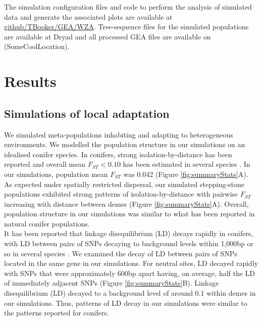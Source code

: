 \documentclass[10pt,twoside,lineno]{GSA_format}
\begin{document}
The simulation configuration files and code to perform the analysis of simulated data and generate the associated plots are available at \url{github/TBooker/GEA/WZA}. Tree-sequence files for the simulated populations are available at Dryad and all processed GEA files are available on (SomeCoolLocation). 

\section{Results}

\subsection{Simulations of local adaptation}

We simulated meta-populations inhabiting and adapting to heterogeneous environments. We modelled the population structure in our simulations on an idealised conifer species. In conifers, strong isolation-by-distance has been reported and overall mean $F_{ST} < 0.10$ has been estimated in several species \citep{Mimura2007,Mosca2014}. In our simulations, population mean $F_{ST}$ was 0.042 (Figure \ref{fig:summaryStats}A). As expected under spatially restricted dispersal, our simulated stepping-stone populations exhibited strong patterns of isolation-by-distance with pairwise $F_{ST}$ increasing with distance between demes (Figure \ref{fig:summaryStats}A). Overall, population structure in our simulations was similar to what has been reported in natural conifer populations.\\

It has been reported that linkage disequilibrium (LD) decays rapidly in conifers, with LD between pairs of SNPs decaying to background levels within 1,000bp or so in several species \citep{Pavy2012}. We examined the decay of LD between pairs of SNPs located in the same gene in our simulations. For neutral sites, LD decayed rapidly with SNPs that were approximately 600bp apart having, on average, half the LD of immediately adjacent SNPs (Figure \ref{fig:summaryStats}B). Linkage disequilibrium (LD) decayed to a background level of around 0.1 within demes in our simulations. Thus, patterns of LD decay in our simulations were similar to the patterns reported for conifers.\\
 
\end{document}
